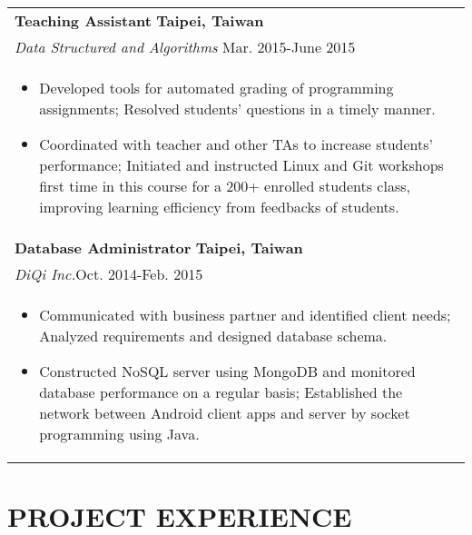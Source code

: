\documentclass[a4paper,10pt]{article} %
\begin{document}
{\begin{tabular}{p{18.5cm}}
{\fontsize{11}{13.2}\textbf{Teaching Assistant}} \hfill \textbf{Taipei, Taiwan}\\
{\it Data Structured and Algorithms} \hfill  Mar. 2015-June 2015 \\%
\begin{itemize}
\vspace{-2mm}
\item Developed tools for automated grading of programming assignments; Resolved students' questions in a timely manner.
\item Coordinated with teacher and other TAs to increase students' performance; Initiated and instructed Linux and Git workshops first time in this course for a 200+ enrolled students class, improving learning efficiency from feedbacks of students.\vspace*{-\baselineskip}
\end{itemize} \\ 
\vspace{0.5mm}

{\fontsize{11}{13.2}\textbf{Database Administrator}} \hfill \textbf{Taipei, Taiwan}\\ 
{\it DiQi Inc.}\hfill  Oct. 2014-Feb. 2015  \\%
\begin{itemize}
\vspace{-2mm}
\item Communicated with business partner and identified client needs; Analyzed requirements and designed database schema.
\item Constructed NoSQL server using MongoDB and monitored database performance on a regular basis; Established the network between Android client apps and server by socket programming using Java. \vspace*{-\baselineskip}
\end{itemize}\\
\end{tabular}


\section{\textbf{PROJECT EXPERIENCE}}
\begin{tabular}{p{18.5cm}}


\end{tabular}}
\end{document}

